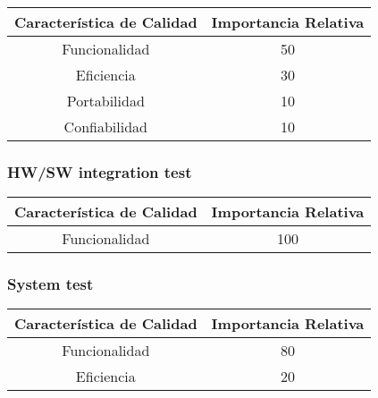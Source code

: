 \documentclass[
11pt, %
]{charter}
\begin{document}
\begin{table}[h!]
\begin{center}
\begin{tabular}{| c | c |}
\hline
\rowcolor[HTML]{C0C0C0}
Característica de Calidad	& 	Importancia Relativa  \\ \hline
Funcionalidad          		&   50					  \\ \hline
Eficiencia   				&   30					  \\ \hline
Portabilidad   				&   10					  \\ \hline
Confiabilidad   			&   10					  \\ \hline
\end{tabular}
\label{tab:HW-FWIntegr}
\end{center}
\end{table} 

\subsubsection{HW/SW integration test}

\begin{table}[h!]
\begin{center}
\begin{tabular}{| c | c |}
\hline
\rowcolor[HTML]{C0C0C0}
Característica de Calidad	& 	Importancia Relativa  \\ \hline
Funcionalidad          		&   100					  \\ \hline
\end{tabular}
\label{tab:HW-SWIntegr}
\end{center}
\end{table} 


\subsubsection{System test}

\begin{table}[h!]
\begin{center}
\begin{tabular}{| c | c |}
\hline
\rowcolor[HTML]{C0C0C0}
Característica de Calidad	& 	Importancia Relativa  \\ \hline
Funcionalidad          		&   80					  \\ \hline
Eficiencia   				&   20					  \\ \hline
\end{tabular}
\label{tab:System test}
\end{center}
\end{table} 
\end{document}
